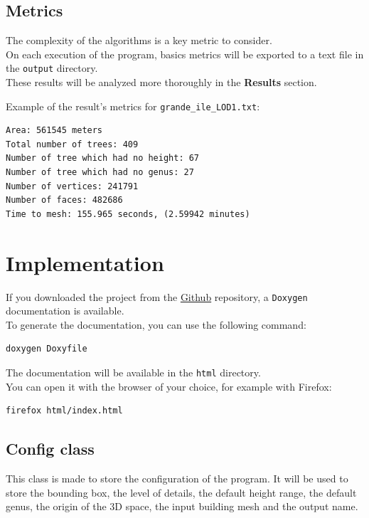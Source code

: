 \documentclass[12pt]{article}
\begin{document}
\subsection{Metrics}
The complexity of the algorithms is a key metric to consider. \\
On each execution of the program, basics metrics will be exported to a text file in
the \texttt{output} directory. \\
These results will be analyzed more thoroughly in the \textbf{Results} section.

Example of the result's metrics for \texttt{grande\_ile\_LOD1.txt}:

\begin{lstlisting}
Area: 561545 meters
Total number of trees: 409
Number of tree which had no height: 67
Number of tree which had no genus: 27
Number of vertices: 241791
Number of faces: 482686
Time to mesh: 155.965 seconds, (2.59942 minutes)
\end{lstlisting}

\section{Implementation}
If you downloaded the project from the \href{https://github.com/master-csmi/2024-m1-vegetation}{Github}
 repository, a \texttt{Doxygen} documentation is available. \\
To generate the documentation, you can use the following command:

\begin{lstlisting}[language=bash]
doxygen Doxyfile
\end{lstlisting}

The documentation will be available in the \texttt{html} directory.\\
You can open it with the browser of your choice, for example with Firefox:

\begin{lstlisting}[language=bash]
firefox html/index.html
\end{lstlisting}

\subsection{Config class}

This class is made to store the configuration of the program. It will be used to
store the bounding box, the level of details, the default height range, the default
genus, the origin of the 3D space, the input building mesh and the output name.
\end{document}
